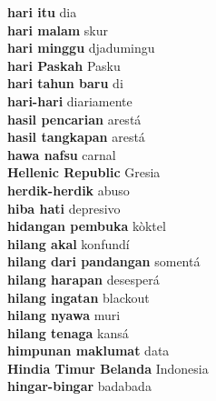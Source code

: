 \textbf{ hari itu  } dia \\
\textbf{ hari malam  } skur \\
\textbf{ hari minggu  } djadumingu \\
\textbf{ hari Paskah  } Pasku \\
\textbf{ hari tahun baru  } di \\
\textbf{ hari-hari  } diariamente \\
\textbf{ hasil pencarian  } arestá \\
\textbf{ hasil tangkapan  } arestá \\
\textbf{ hawa nafsu  } carnal \\
\textbf{ Hellenic Republic  } Gresia \\
\textbf{ herdik-herdik  } abuso \\
\textbf{ hiba hati  } depresivo \\
\textbf{ hidangan pembuka  } kòktel \\
\textbf{ hilang akal  } konfundí \\
\textbf{ hilang dari pandangan  } somentá \\
\textbf{ hilang harapan  } desesperá \\
\textbf{ hilang ingatan  } blackout \\
\textbf{ hilang nyawa  } muri \\
\textbf{ hilang tenaga  } kansá \\
\textbf{ himpunan maklumat  } data \\
\textbf{ Hindia Timur Belanda  } Indonesia \\
\textbf{ hingar-bingar  } badabada \\
